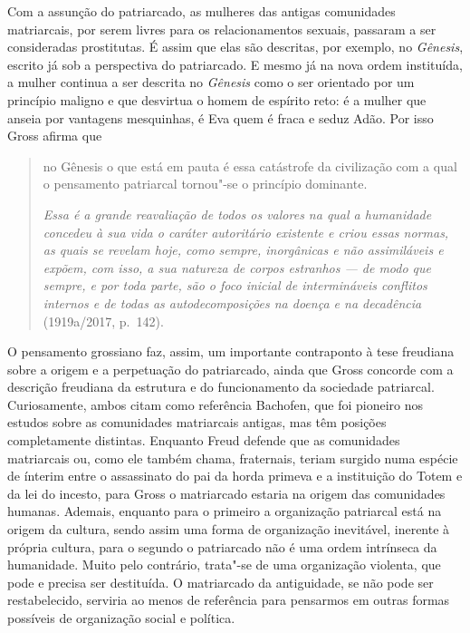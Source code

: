 Com a assunção do patriarcado, as mulheres das antigas comunidades
matriarcais, por serem livres para os relacionamentos sexuais, passaram
a ser consideradas prostitutas. É assim que elas são descritas, por
exemplo, no \emph{Gênesis}, escrito já sob a perspectiva do patriarcado.
E mesmo já na nova ordem instituída, a mulher continua a ser descrita no
\emph{Gênesis} como o ser orientado por um princípio maligno e que
desvirtua o homem de espírito reto: é a mulher que anseia por vantagens
mesquinhas, é Eva quem é fraca e seduz Adão. Por isso Gross afirma que

\begin{quote}
no Gênesis o que está em pauta é essa catástrofe da civilização com a
qual o pensamento patriarcal tornou"-se o princípio dominante.

\emph{Essa é a grande reavaliação de todos os valores na qual a
humanidade concedeu à sua vida o caráter autoritário existente e criou
essas normas, as quais se revelam hoje, como sempre, inorgânicas e não
assimiláveis e expõem, com isso, a sua natureza de corpos estranhos ---
de modo que sempre, e por toda parte, são o foco inicial de
intermináveis conflitos internos e de todas as autodecomposições na
doença e na decadência} (1919a/2017, p.~142).
\end{quote}

O pensamento grossiano faz, assim, um importante contraponto à tese
freudiana sobre a origem e a perpetuação do patriarcado, ainda que Gross
concorde com a descrição freudiana da estrutura e do funcionamento da
sociedade patriarcal. Curiosamente, ambos citam como referência
Bachofen, que foi pioneiro nos estudos sobre as comunidades matriarcais
antigas, mas têm posições completamente distintas. Enquanto Freud
defende que as comunidades matriarcais ou, como ele também chama,
fraternais, teriam surgido numa espécie de ínterim entre o assassinato
do pai da horda primeva e a instituição do Totem e da lei do incesto,
para Gross o matriarcado estaria na origem das comunidades humanas.
Ademais, enquanto para o primeiro a organização patriarcal está na
origem da cultura, sendo assim uma forma de organização inevitável,
inerente à própria cultura, para o segundo o patriarcado não é uma ordem
intrínseca da humanidade. Muito pelo contrário, trata"-se de uma
organização violenta, que pode e precisa ser destituída. O matriarcado
da antiguidade, se não pode ser restabelecido, serviria ao menos de
referência para pensarmos em outras formas possíveis de organização
social e política.

